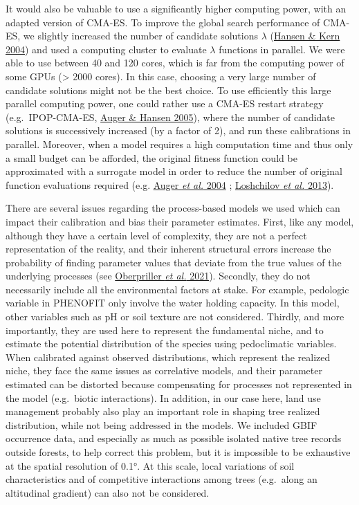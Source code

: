 \documentclass[11pt,]{article}
\begin{document}
It would also be valuable to use a significantly higher computing power,
with an adapted version of CMA-ES. To improve the global search
performance of CMA-ES, we slightly increased the number of candidate
solutions \(\lambda\) (\protect\hyperlink{ref-Hansen2004}{Hansen \& Kern
2004}) and used a computing cluster to evaluate \(\lambda\) functions in
parallel. We were able to use between 40 and 120 cores, which is far
from the computing power of some GPUs (\textgreater{} 2000 cores). In
this case, choosing a very large number of candidate solutions might not
be the best choice. To use efficiently this large parallel computing
power, one could rather use a CMA-ES restart strategy (e.g.~IPOP-CMA-ES,
\protect\hyperlink{ref-Auger2005}{Auger \& Hansen 2005}), where the
number of candidate solutions is successively increased (by a factor of
2), and run these calibrations in parallel. Moreover, when a model
requires a high computation time and thus only a small budget can be
afforded, the original fitness function could be approximated with a
surrogate model in order to reduce the number of original function
evaluations required (e.g. \protect\hyperlink{ref-Auger2004}{Auger
\emph{et al.} 2004} ; \protect\hyperlink{ref-Loshchilov2013}{Loshchilov
\emph{et al.} 2013}).

There are several issues regarding the process-based models we used
which can impact their calibration and bias their parameter estimates.
First, like any model, although they have a certain level of complexity,
they are not a perfect representation of the reality, and their inherent
structural errors increase the probability of finding parameter values
that deviate from the true values of the underlying processes (see
\protect\hyperlink{ref-Oberpriller2021}{Oberpriller \emph{et al.}
2021}). Secondly, they do not necessarily include all the environmental
factors at stake. For example, pedologic variable in PHENOFIT only
involve the water holding capacity. In this model, other variables such
as pH or soil texture are not considered. Thirdly, and more importantly,
they are used here to represent the fundamental niche, and to estimate
the potential distribution of the species using pedoclimatic variables.
When calibrated against observed distributions, which represent the
realized niche, they face the same issues as correlative models, and
their parameter estimated can be distorted because compensating for
processes not represented in the model (e.g.~biotic interactions). In
addition, in our case here, land use management probably also play an
important role in shaping tree realized distribution, while not being
addressed in the models. We included GBIF occurrence data, and
especially as much as possible isolated native tree records outside
forests, to help correct this problem, but it is impossible to be
exhaustive at the spatial resolution of 0.1°. At this scale, local
variations of soil characteristics and of competitive interactions among
trees (e.g.~along an altitudinal gradient) can also not be considered.
\end{document}

